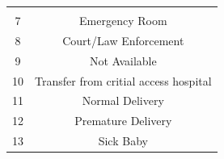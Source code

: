\documentclass[]{article}
\begin{document}
\begin{itemize}
\begin{longtable}[c]{@{}cc@{}}
\begin{minipage}[t]{0.37\columnwidth}
  \strut\end{minipage}\tabularnewline
  \begin{minipage}[t]{0.29\columnwidth}\centering\strut
  7
  \strut\end{minipage} &
  \begin{minipage}[t]{0.37\columnwidth}\centering\strut
  Emergency Room
  \strut\end{minipage}\tabularnewline
  \begin{minipage}[t]{0.29\columnwidth}\centering\strut
  8
  \strut\end{minipage} &
  \begin{minipage}[t]{0.37\columnwidth}\centering\strut
  Court/Law Enforcement
  \strut\end{minipage}\tabularnewline
  \begin{minipage}[t]{0.29\columnwidth}\centering\strut
  9
  \strut\end{minipage} &
  \begin{minipage}[t]{0.37\columnwidth}\centering\strut
  Not Available
  \strut\end{minipage}\tabularnewline
  \begin{minipage}[t]{0.29\columnwidth}\centering\strut
  10
  \strut\end{minipage} &
  \begin{minipage}[t]{0.37\columnwidth}\centering\strut
  Transfer from critial access hospital
  \strut\end{minipage}\tabularnewline
  \begin{minipage}[t]{0.29\columnwidth}\centering\strut
  11
  \strut\end{minipage} &
  \begin{minipage}[t]{0.37\columnwidth}\centering\strut
  Normal Delivery
  \strut\end{minipage}\tabularnewline
  \begin{minipage}[t]{0.29\columnwidth}\centering\strut
  12
  \strut\end{minipage} &
  \begin{minipage}[t]{0.37\columnwidth}\centering\strut
  Premature Delivery
  \strut\end{minipage}\tabularnewline
  \begin{minipage}[t]{0.29\columnwidth}\centering\strut
  13
  \strut\end{minipage} &
  \begin{minipage}[t]{0.37\columnwidth}\centering\strut
  Sick Baby
  \strut\end{minipage}\tabularnewline

\end{longtable}
\end{itemize}
\end{document}

